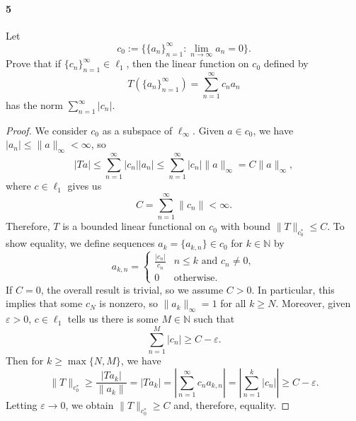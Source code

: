 \documentclass[12pt]{article}
\newlength{\myparskip}
\newenvironment{fullbox}{\begin{lrbox}{\savefullbox}\begin{minipage}{\dimexpr\textwidth-2\fboxsep\relax}\setlength{\parskip}{\myparskip}}{\end{minipage}\end{lrbox}\framebox[\textwidth]{\usebox{\savefullbox}}}
\newenvironment{pbox}[1][]{\begin{fullbox}\def\temp{#1}\ifx\temp\empty\else\paragraph{#1}\phantom{}\fi}{\end{fullbox}}
\theoremstyle{definition}
\newcommand{\N}{\mathbb{N}}
\newcommand{\eps}{\varepsilon}
\newcommand{\<}{\langle}
\renewcommand{\>}{\rangle}
\begin{document}
\newpage
\begin{pbox}[5]
    Let
    \[
        c_0 := \{\{a_n\}_{n=1}^{\infty} : \lim_{n \to \infty} a_n = 0\}.
    \]
    Prove that if $\{c_n\}_{n=1}^{\infty} \in \ell_1$, then the linear function on $c_0$ defined by
    \[
        T(\{a_n\}_{n=1}^{\infty}) = \sum_{n=1}^{\infty} c_n a_n
    \]
    has the norm $\sum_{n=1}^{\infty} |c_n|$.
\end{pbox}

\begin{proof}
    We consider $c_0$ as a subspace of $\ell_\infty$.
    Given $a \in c_0$, we have $|a_n| \leq \|a\|_\infty < \infty$, so
    \[
        |Ta|
            \leq \sum_{n=1}^{\infty} |c_n||a_n|
            \leq \sum_{n=1}^{\infty} |c_n|\|a\|_\infty
            = C\|a\|_\infty,
    \]
    where $c \in \ell_1$ gives us
    \[
        C = \sum_{n=1}^{\infty} \|c_n\| < \infty.
    \]
    Therefore, $T$ is a bounded linear functional on $c_0$ with bound $\|T\|_{c_0^*} \leq C$.
    To show equality, we define sequences $a_k = \{a_{k,n}\} \in c_0$ for $k \in \N$ by
    \[
        a_{k, n} = \begin{cases}
            \frac{|c_n|}{c_n} & n \leq k \text{ and } c_n \ne 0, \\
            0 & \text{otherwise}.
        \end{cases}
    \]
    If $C = 0$, the overall result is trivial, so we assume $C > 0$.
    In particular, this implies that some $c_N$ is nonzero, so $\|a_k\|_\infty = 1$ for all $k \geq N$.
    Moreover, given $\eps > 0$, $c \in \ell_1$ tells us there is some $M \in \N$ such that
    \[
        \sum_{n=1}^{M} |c_n| \geq C - \eps.
    \]
    Then for $k \geq \max\{N, M\}$, we have
    \[
        \|T\|_{c_0^*}
            \geq \frac{|Ta_k|}{\|a_k\|}
            = |Ta_k|
            = \left|\sum_{n=1}^{\infty} c_na_{k,n}\right|
            = \left|\sum_{n=1}^{k} |c_n|\right|
            \geq C - \eps.
    \]
    Letting $\eps \to 0$, we obtain $\|T\|_{c_0^*} \geq C$ and, therefore, equality.
\end{proof}
\end{document}
